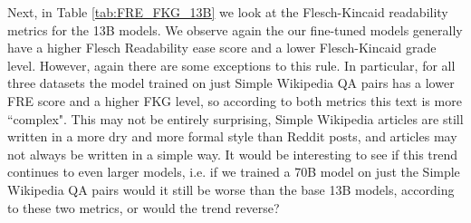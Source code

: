 \documentclass[11pt, oneside]{article}   	%
\begin{document}

Next, in Table \ref{tab:FRE_FKG_13B} we look at the Flesch-Kincaid readability metrics for the 13B models. 
We observe again the our fine-tuned models generally have a higher Flesch Readability ease score and a lower Flesch-Kincaid grade level.
However, again there are some exceptions to this rule.
In particular, for all three datasets the model trained on just Simple Wikipedia QA pairs has a lower FRE score and a higher FKG level, so according to both metrics this text is more ``complex".
This may not be entirely surprising, Simple Wikipedia articles are still written in a more dry and more formal style than Reddit posts, and articles may not always be written in a simple way. 
It would be interesting to see if this trend continues to even larger models, i.e. if we trained a 70B model on just the Simple Wikipedia QA pairs would it still be worse than the base 13B models, according to these two metrics, or would the trend reverse?
\end{document}
